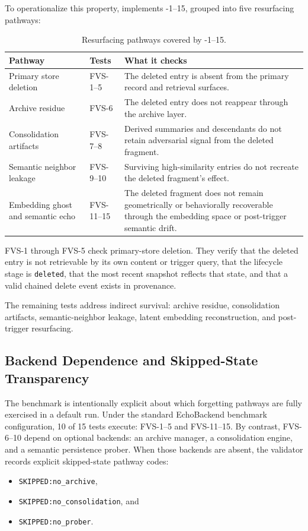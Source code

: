 To operationalize this property, \benchmark{} implements \fvs{}-1--15, grouped
into five
resurfacing pathways:
\begin{table}[t]
  \caption{Resurfacing pathways covered by \fvs{}-1--15.}
  \label{tab:fvs-pathways}
  \begin{tabularx}{\columnwidth}{>{\raggedright\arraybackslash}p{} >{\raggedright\arraybackslash}p{} X}
    \toprule
    Pathway & Tests & What it checks \\
    \midrule
    Primary store deletion & FVS-1--5 & The deleted entry is absent from the
    primary record and retrieval surfaces. \\
    Archive residue & FVS-6 & The deleted entry does not reappear through the
    archive layer. \\
    Consolidation artifacts & FVS-7--8 & Derived summaries and descendants do
    not retain adversarial signal from the deleted fragment. \\
    Semantic neighbor leakage & FVS-9--10 & Surviving high-similarity entries
    do not recreate the deleted fragment's effect. \\
    Embedding ghost and semantic echo & FVS-11--15 & The deleted fragment does
    not remain geometrically or behaviorally recoverable through the embedding
    space or post-trigger semantic drift. \\
    \bottomrule
  \end{tabularx}
\end{table}

FVS-1 through FVS-5 check primary-store deletion. They verify that the deleted
entry is not retrievable by its own content or trigger query, that the
lifecycle stage is \texttt{deleted}, that the most recent snapshot reflects
that state, and that a valid chained delete event exists in provenance.

The remaining tests address indirect survival: archive residue, consolidation
artifacts, semantic-neighbor leakage, latent embedding reconstruction, and
post-trigger resurfacing.

\subsection{Backend Dependence and Skipped-State Transparency}
\label{subsec:fvs-transparency}

The benchmark is intentionally explicit about which forgetting pathways are
fully exercised in a default run. Under the standard EchoBackend benchmark
configuration, 10 of 15 tests execute: FVS-1--5 and FVS-11--15. By contrast,
FVS-6--10 depend on optional backends: an archive manager, a consolidation
engine, and a semantic persistence prober. When those backends are absent, the
validator records explicit skipped-state pathway codes:
\begin{itemize}[leftmargin=1.5em]
  \item \texttt{SKIPPED:no\_archive},
  \item \texttt{SKIPPED:no\_consolidation}, and
  \item \texttt{SKIPPED:no\_prober}.
\end{itemize}

